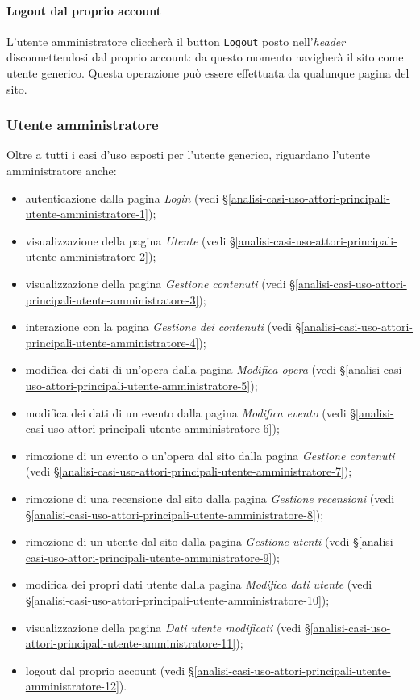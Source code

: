 \paragraph{Logout dal proprio account}
\label{analisi-casi-uso-attori-principali-utente-autenticato-10}
L'utente amministratore cliccherà il button \texttt{Logout} posto nell'\textit{header} disconnettendosi dal proprio account: da questo momento navigherà il sito come utente generico. Questa operazione può essere effettuata da qualunque pagina del sito.

\subsubsection{Utente amministratore}
\label{analisi-casi-uso-attori-principali-utente-amministratore}
Oltre a tutti i casi d'uso esposti per l'utente generico, riguardano l'utente amministratore anche:
\begin{itemize}
	\item autenticazione dalla pagina \textit{Login} (vedi §\ref{analisi-casi-uso-attori-principali-utente-amministratore-1});
	\item visualizzazione della pagina \textit{Utente} (vedi §\ref{analisi-casi-uso-attori-principali-utente-amministratore-2});
	\item visualizzazione della pagina \textit{Gestione contenuti} (vedi §\ref{analisi-casi-uso-attori-principali-utente-amministratore-3});
	\item interazione con la pagina \textit{Gestione dei contenuti} (vedi §\ref{analisi-casi-uso-attori-principali-utente-amministratore-4});
	\item modifica dei dati di un'opera dalla pagina \textit{Modifica opera} (vedi §\ref{analisi-casi-uso-attori-principali-utente-amministratore-5});
	\item modifica dei dati di un evento dalla pagina \textit{Modifica evento} (vedi §\ref{analisi-casi-uso-attori-principali-utente-amministratore-6});
	\item rimozione di un evento o un'opera dal sito dalla pagina \textit{Gestione contenuti} (vedi §\ref{analisi-casi-uso-attori-principali-utente-amministratore-7});
	\item rimozione di una recensione dal sito dalla pagina \textit{Gestione recensioni} (vedi §\ref{analisi-casi-uso-attori-principali-utente-amministratore-8});
	\item rimozione di un utente dal sito dalla pagina \textit{Gestione utenti} (vedi §\ref{analisi-casi-uso-attori-principali-utente-amministratore-9});
	\item modifica dei propri dati utente dalla pagina \textit{Modifica dati utente} (vedi §\ref{analisi-casi-uso-attori-principali-utente-amministratore-10});
	\item visualizzazione della pagina \textit{Dati utente modificati} (vedi §\ref{analisi-casi-uso-attori-principali-utente-amministratore-11});
	\item logout dal proprio account (vedi §\ref{analisi-casi-uso-attori-principali-utente-amministratore-12}).
\end{itemize}

